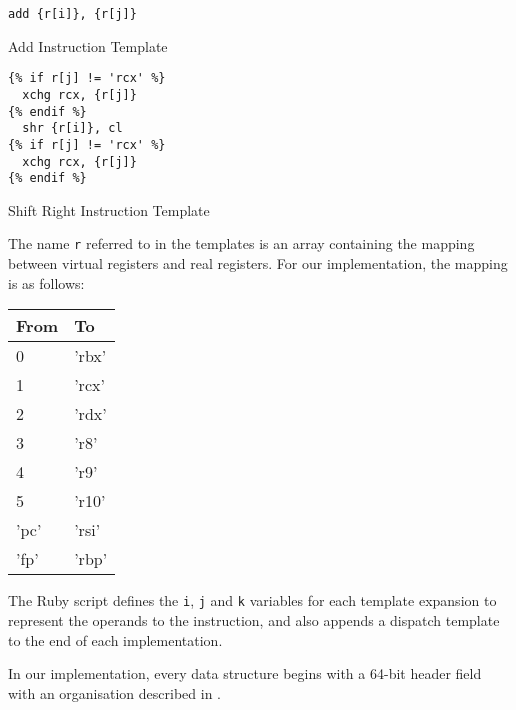 		\begin{doublefig}
			\begin{halffig}
				\begin{lstlisting}
add {r[i]}, {r[j]}
				\end{lstlisting}
				\caption{Add Instruction Template}
				\label{fig:addtemplate}
			\end{halffig}
			\begin{halffig}
				\begin{lstlisting}
{% if r[j] != 'rcx' %}
  xchg rcx, {r[j]}
{% endif %}
  shr {r[i]}, cl
{% if r[j] != 'rcx' %}
  xchg rcx, {r[j]}
{% endif %}
				\end{lstlisting}
				\caption{Shift Right Instruction Template}
				\label{fig:shrtemplate}
			\end{halffig}
		\end{doublefig}
		
		The name \texttt{r} referred to in the templates is an array containing the mapping between virtual registers and real registers. For our implementation, the mapping is as follows:
		
		\begin{tabular}{|l|l|}
			\hline
			From & To \\
			\hline
			0 & 'rbx' \\
			\hline
			1 & 'rcx' \\
			\hline
			2 & 'rdx' \\
			\hline
			3 & 'r8' \\
			\hline
			4 & 'r9' \\
			\hline
			5 & 'r10' \\
			\hline
			'pc' & 'rsi' \\
			\hline
			'fp' & 'rbp' \\ 
			\hline
		\end{tabular}
		
		The Ruby script defines the \texttt{i}, \texttt{j} and \texttt{k} variables for each template expansion to represent the operands to the instruction, and also appends a dispatch template to the end of each implementation.
			
			
		
		In our implementation, every data structure begins with a 64-bit header field with an organisation described in . 
		
